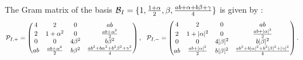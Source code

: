 \documentclass[10pt,a4paper]{amsart}
\begin{document}
\begin{proposition}\label{1 propn}
The Gram matrix of the basis $ \mathcal{B}_{\rm{I}} = \{1, \frac{1 +\alpha}{2}, \beta, \frac{ab + \alpha + b \beta +\gamma}{4} \}$ is given by :
$$
\mathcal{P}_{\rm{I}, +}=  
\begin{pmatrix}
4 & 2 & 0 & ab \\
2 & 1 + \alpha^2 & 0 & \frac{ab + \alpha^2}{2} \\
0 & 0 & 4\beta^2 & b\beta^2 \\
ab & \frac{ab + \alpha^2}{2} & b\beta^2 & \frac{a b^2 + b \alpha^2 + b^2 \beta^2 + \gamma^2}{4}
\end{pmatrix},  \ \
\mathcal{P}_{\rm{I}, -} = \begin{pmatrix}
4 & 2 & 0 & ab \\
2 & 1 + |\alpha|^2 & 0 & \frac{ab + |\alpha|^2}{2} \\
0 & 0 & 4|\beta|^2 & b|\beta|^2 \\
ab & \frac{ab + |\alpha|^2}{2} & b|\beta|^2 & \frac{a b^2 + b |\alpha|^2 + b^2 |\beta|^2 + |\gamma|^2}{4} 
\end{pmatrix}.
$$
\end{proposition}
\end{document}
